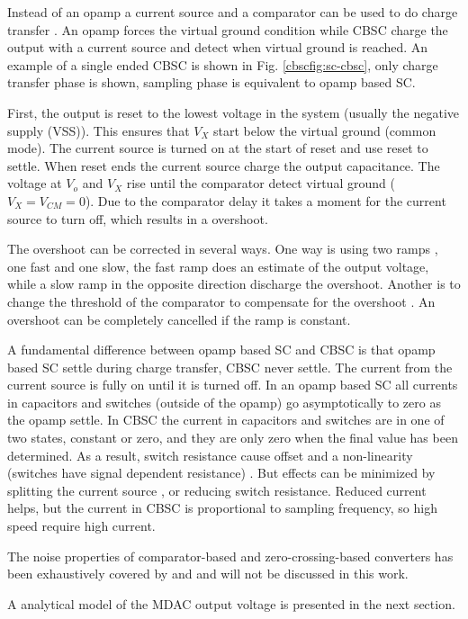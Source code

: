 Instead of an opamp a current source and a comparator can
be used to do charge transfer \cite{sepke06}. An opamp forces the virtual ground condition
while CBSC charge the output with a current source and detect when
virtual ground is reached. An example of a single ended CBSC is shown in
Fig. \ref{cbscfig:sc-cbsc}, only charge transfer phase is shown, sampling
phase is equivalent to opamp based SC.

 First, the output is reset to
the lowest voltage in the system (usually the negative supply
(VSS)). This ensures that $V_X$ start 
below the virtual ground (common mode). The current source is turned
on at the start of
reset and use reset to settle.
 When reset ends the current
source charge the output capacitance. The voltage at 
$V_o$ and $V_X$ rise until the comparator detect virtual ground ($V_X
 = V_{CM}=0$). Due to the comparator delay it takes a moment for the
 current source to turn off, which results in a overshoot. 

The
 overshoot can be corrected in several ways. One way is using two
 ramps \cite{sepke06}, one fast and
 one slow, the fast ramp does an estimate of the output voltage, while
 a slow ramp in the opposite direction discharge the 
 overshoot. Another is to change the threshold of the
 comparator to compensate for the overshoot \cite{brooks07}. An
 overshoot can be completely cancelled if the ramp is constant. 

A
 fundamental difference between opamp based SC and CBSC is that opamp based SC settle during charge
transfer, CBSC never settle. The current from the current source is
fully on until it is turned off. In an opamp based SC all currents in
capacitors and switches (outside of the opamp) go asymptotically to
zero as the opamp settle. In CBSC the current in capacitors and
switches are in one of two states, constant or zero, and they are
only zero when the final value has been determined. As a result, switch resistance cause offset and a
non-linearity (switches have signal dependent resistance) \cite{fiorenza06,brooks07a}. But effects
can be minimized by splitting the current source \cite{brooks07a}, or
reducing switch resistance. Reduced current helps, but the current
in CBSC is
proportional to sampling frequency, so high speed require high current.

The noise properties of
comparator-based and zero-crossing-based converters has been
exhaustively covered by \cite{sepke06th} and \cite{chow07} and
will not be discussed in this work. 

A analytical model of the MDAC output voltage is
presented in the next section.

